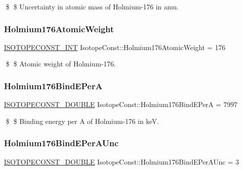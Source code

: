 \$ \$ Uncertainty in atomic mass of Holmium-\/176 in amu. \mbox{\label{group___isotope_const-_holmium-_ho176_ga2948c3f82cf0a093c38e3811ddda036e}} 
\subsubsection{\texorpdfstring{Holmium176\+Atomic\+Weight}{Holmium176AtomicWeight}}
{\footnotesize\ttfamily \mbox{\hyperlink{group___isotope_const-_macros_ga5f18360b3e99483a35c32d789e62621c}{I\+S\+O\+T\+O\+P\+E\+C\+O\+N\+S\+T\+\_\+\+I\+NT}} Isotope\+Const\+::\+Holmium176\+Atomic\+Weight = 176}

\$ \$ Atomic weight of Holmium-\/176. \mbox{\label{group___isotope_const-_holmium-_ho176_ga3112badc7bf314d9253bb06fc83b1dd7}} 
\subsubsection{\texorpdfstring{Holmium176\+Bind\+E\+PerA}{Holmium176BindEPerA}}
{\footnotesize\ttfamily \mbox{\hyperlink{group___isotope_const-_macros_ga8f45a7272ce02c0b4c65c44636ed719a}{I\+S\+O\+T\+O\+P\+E\+C\+O\+N\+S\+T\+\_\+\+D\+O\+U\+B\+LE}} Isotope\+Const\+::\+Holmium176\+Bind\+E\+PerA = 7997}

\$ \$ Binding energy per A of Holmium-\/176 in keV. \mbox{\label{group___isotope_const-_holmium-_ho176_ga8dffb5e8dff4b1f6e514e56dc5d9751e}} 
\subsubsection{\texorpdfstring{Holmium176\+Bind\+E\+Per\+A\+Unc}{Holmium176BindEPerAUnc}}
{\footnotesize\ttfamily \mbox{\hyperlink{group___isotope_const-_macros_ga8f45a7272ce02c0b4c65c44636ed719a}{I\+S\+O\+T\+O\+P\+E\+C\+O\+N\+S\+T\+\_\+\+D\+O\+U\+B\+LE}} Isotope\+Const\+::\+Holmium176\+Bind\+E\+Per\+A\+Unc = 3}

